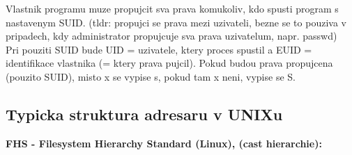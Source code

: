 \documentclass[a4paper, 11pt]{article}
\begin{document}
Vlastnik programu muze propujcit sva prava komukoliv, kdo spusti program s nastavenym SUID. (tldr: propujci se prava mezi uzivateli, bezne se to pouziva v pripadech, kdy administrator propujcuje sva prava uzivatelum, napr. passwd) \\

Pri pouziti SUID bude UID = uzivatele, ktery proces spustil a EUID = identifikace vlastnika (= ktery prava pujcil). Pokud budou prava propujcena (pouzito SUID), misto x se vypise s, pokud tam x neni, vypise se S. \\

\subsection{Typicka struktura adresaru v UNIXu}
\textbf{FHS - Filesystem Hierarchy Standard (Linux), (cast hierarchie):}
\end{document}
